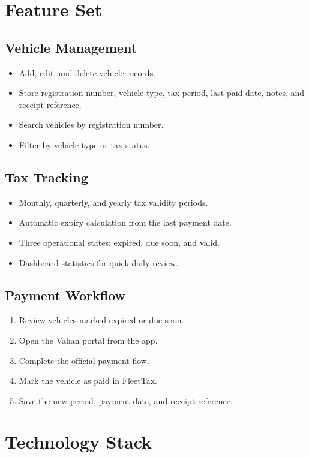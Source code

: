 \documentclass[11pt,a4paper]{article}
\begin{document}
\section{Feature Set}

\subsection{Vehicle Management}
\begin{itemize}[leftmargin=*]
  \item Add, edit, and delete vehicle records.
  \item Store registration number, vehicle type, tax period, last paid date, notes, and receipt reference.
  \item Search vehicles by registration number.
  \item Filter by vehicle type or tax status.
\end{itemize}

\subsection{Tax Tracking}
\begin{itemize}[leftmargin=*]
  \item Monthly, quarterly, and yearly tax validity periods.
  \item Automatic expiry calculation from the last payment date.
  \item Three operational states: expired, due soon, and valid.
  \item Dashboard statistics for quick daily review.
\end{itemize}

\subsection{Payment Workflow}
\begin{enumerate}[leftmargin=*]
  \item Review vehicles marked expired or due soon.
  \item Open the Vahan portal from the app.
  \item Complete the official payment flow.
  \item Mark the vehicle as paid in FleetTax.
  \item Save the new period, payment date, and receipt reference.
\end{enumerate}

\section{Technology Stack}
\end{document}
